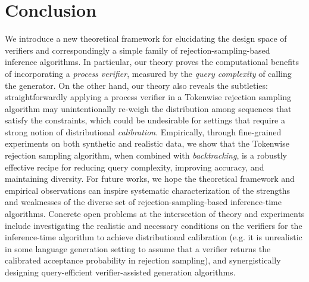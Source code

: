 \section{Conclusion}

We introduce a new theoretical framework for elucidating the design space of verifiers and correspondingly a simple family of rejection-sampling-based inference algorithms.
In particular, our theory proves the computational benefits of incorporating a \emph{process verifier},
measured by the \emph{query complexity} of calling the generator.
On the other hand, our theory also reveals the subtleties:
straightforwardly applying a process verifier in a Tokenwise rejection sampling algorithm may unintentionally re-weigh the distribution among sequences that satisfy the constraints,
which could be undesirable for settings that require a strong notion of distributional \emph{calibration}.
Empirically, through fine-grained experiments on both synthetic and realistic data,
we show that the Tokenwise rejection sampling algorithm, when combined with \emph{backtracking},
is a robustly effective recipe for reducing query
complexity, improving accuracy, and maintaining diversity. 
For future works, we hope the theoretical framework and empirical observations can inspire systematic characterization of the strengths and weaknesses of the diverse set of rejection-sampling-based inference-time algorithms.
Concrete open problems at the intersection of theory and experiments include 
investigating the realistic and necessary conditions on the verifiers for the inference-time algorithm to
achieve distributional calibration
(e.g. it is unrealistic in some language generation setting to assume that a verifier returns the calibrated acceptance probability in rejection sampling),
and synergistically designing query-efficient verifier-assisted generation algorithms. 

